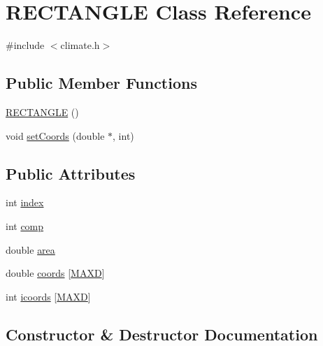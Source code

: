 \hypertarget{class_r_e_c_t_a_n_g_l_e}{}\section{R\+E\+C\+T\+A\+N\+G\+LE Class Reference}
\label{class_r_e_c_t_a_n_g_l_e}


{\ttfamily \#include $<$climate.\+h$>$}

\subsection*{Public Member Functions}
\begin{DoxyCompactItemize}
\item 
\hyperlink{class_r_e_c_t_a_n_g_l_e_a804434ae6eb0b3482233e6a453c3d78e}{R\+E\+C\+T\+A\+N\+G\+LE} ()
\item 
void \hyperlink{class_r_e_c_t_a_n_g_l_e_a2eb24876044471b57f3cbee7f41ce7f7}{set\+Coords} (double $\ast$, int)
\end{DoxyCompactItemize}
\subsection*{Public Attributes}
\begin{DoxyCompactItemize}
\item 
int \hyperlink{class_r_e_c_t_a_n_g_l_e_a065964c77ec647cfcbc87a49299cc4d3}{index}
\item 
int \hyperlink{class_r_e_c_t_a_n_g_l_e_a45d165ef26bcb8cce21610cc1e1e5215}{comp}
\item 
double \hyperlink{class_r_e_c_t_a_n_g_l_e_a22324bb26571b01f16130ae952a48042}{area}
\item 
double \hyperlink{class_r_e_c_t_a_n_g_l_e_a5632e6ed2e0ef39ce68cc1fe69932abd}{coords} \mbox{[}\hyperlink{geom_8h_aabfcbcb5ac86a1edac4035264bc7d2b8ac79558c6c6666a44ddf7e701241b8211}{M\+A\+XD}\mbox{]}
\item 
int \hyperlink{class_r_e_c_t_a_n_g_l_e_a057e5c1dafe3a9d68154899fb45453b6}{icoords} \mbox{[}\hyperlink{geom_8h_aabfcbcb5ac86a1edac4035264bc7d2b8ac79558c6c6666a44ddf7e701241b8211}{M\+A\+XD}\mbox{]}
\end{DoxyCompactItemize}


\subsection{Constructor \& Destructor Documentation}
